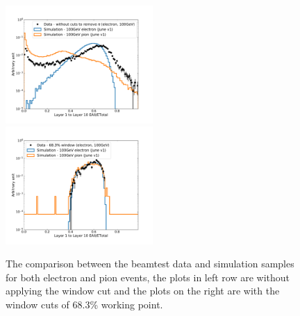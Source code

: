 \begin{figure}[p]
\begin{center}
    \includegraphics[width=0.5\textwidth]{Fig/fig_HGCAL/L1toL10-EAll-over-ETotal-NoWindow}~
    \includegraphics[width=0.5\textwidth]{Fig/fig_HGCAL/L1toL10-EAll-over-ETotal-WP68}\\
    \caption{The comparison between the beamtest data and simulation samples for both electron and pion events, the plots in left row are without applying the window cut and the plots on the right are with the window cuts of 68.3\% working point.}
    \label{fig:DataMC-comparison}
    \end{center}
\end{figure}

